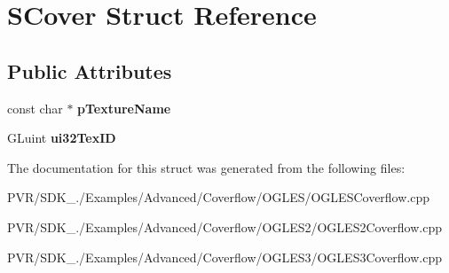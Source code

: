 \hypertarget{struct_s_cover}{\section{S\+Cover Struct Reference}
\label{struct_s_cover}
}
\subsection*{Public Attributes}
\begin{DoxyCompactItemize}
\item 
\hypertarget{struct_s_cover_aec12307b59d12cd27246c69049790b74}{const char $\ast$ {\bfseries p\+Texture\+Name}}\label{struct_s_cover_aec12307b59d12cd27246c69049790b74}

\item 
\hypertarget{struct_s_cover_a51179e54f10608d487a95a19ad7a0f07}{G\+Luint {\bfseries ui32\+Tex\+I\+D}}\label{struct_s_cover_a51179e54f10608d487a95a19ad7a0f07}

\end{DoxyCompactItemize}


The documentation for this struct was generated from the following files\+:\begin{DoxyCompactItemize}
\item 
P\+V\+R/\+S\+D\+K\+\_./\+Examples/\+Advanced/\+Coverflow/\+O\+G\+L\+E\+S/O\+G\+L\+E\+S\+Coverflow.\+cpp\item 
P\+V\+R/\+S\+D\+K\+\_./\+Examples/\+Advanced/\+Coverflow/\+O\+G\+L\+E\+S2/O\+G\+L\+E\+S2\+Coverflow.\+cpp\item 
P\+V\+R/\+S\+D\+K\+\_./\+Examples/\+Advanced/\+Coverflow/\+O\+G\+L\+E\+S3/O\+G\+L\+E\+S3\+Coverflow.\+cpp\end{DoxyCompactItemize}
